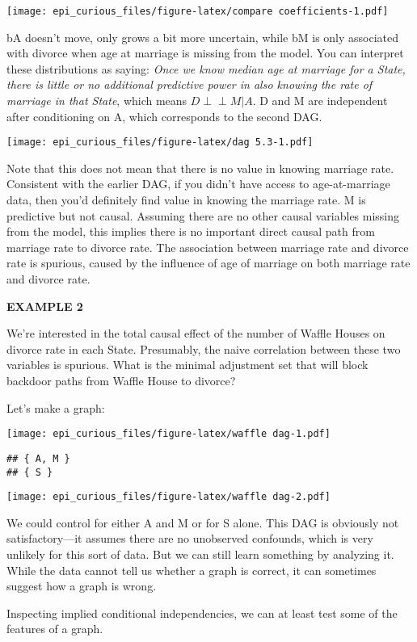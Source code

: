 \documentclass[
]{article}
\begin{document}
\texttt{[image: epi\_curious\_files/figure-latex/compare coefficients-1.pdf]}

bA doesn't move, only grows a bit more uncertain, while bM is only
associated with divorce when age at marriage is missing from the model.
You can interpret these distributions as saying: \emph{Once we know
median age at marriage for a State, there is little or no additional
predictive power in also knowing the rate of marriage in that State},
which means \(D \!\perp\!\!\!\perp M|A\). D and M are independent after
conditioning on A, which corresponds to the second DAG.

\texttt{[image: epi\_curious\_files/figure-latex/dag 5.3-1.pdf]}

Note that this does not mean that there is no value in knowing marriage
rate. Consistent with the earlier DAG, if you didn't have access to
age-at-marriage data, then you'd definitely find value in knowing the
marriage rate. M is predictive but not causal. Assuming there are no
other causal variables missing from the model, this implies there is no
important direct causal path from marriage rate to divorce rate. The
association between marriage rate and divorce rate is spurious, caused
by the influence of age of marriage on both marriage rate and divorce
rate.

\textbf{EXAMPLE 2}

We're interested in the total causal effect of the number of Waffle
Houses on divorce rate in each State. Presumably, the naive correlation
between these two variables is spurious. What is the minimal adjustment
set that will block backdoor paths from Waffle House to divorce?

Let's make a graph:

\texttt{[image: epi\_curious\_files/figure-latex/waffle dag-1.pdf]}

\begin{verbatim}
## { A, M }
## { S }
\end{verbatim}

\texttt{[image: epi\_curious\_files/figure-latex/waffle dag-2.pdf]}

We could control for either A and M or for S alone. This DAG is
obviously not satisfactory---it assumes there are no unobserved
confounds, which is very unlikely for this sort of data. But we can
still learn something by analyzing it. While the data cannot tell us
whether a graph is correct, it can sometimes suggest how a graph is
wrong.

Inspecting implied conditional independencies, we can at least test some
of the features of a graph.
\end{document}

